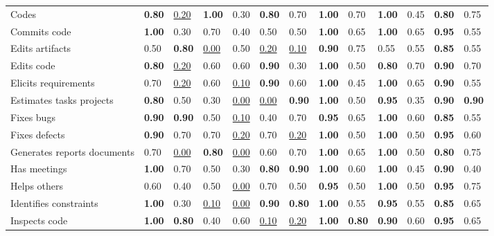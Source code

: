 \begin{tabular}{lllllllllllll}
Codes & \textbf{0.80} & \underline{0.20} & \textbf{1.00} & 0.30 & \textbf{0.80} & 0.70 & \textbf{1.00} & 0.70 & \textbf{1.00} & 0.45 & \textbf{0.80} & 0.75 \\
Commits code & \textbf{1.00} & 0.30 & 0.70 & 0.40 & 0.50 & 0.50 & \textbf{1.00} & 0.65 & \textbf{1.00} & 0.65 & \textbf{0.95} & 0.55 \\
Edits artifacts & 0.50 & \textbf{0.80} & \underline{0.00} & 0.50 & \underline{0.20} & \underline{0.10} & \textbf{0.90} & 0.75 & 0.55 & 0.55 & \textbf{0.85} & 0.55 \\
Edits code & \textbf{0.80} & \underline{0.20} & 0.60 & 0.60 & \textbf{0.90} & 0.30 & \textbf{1.00} & 0.50 & \textbf{0.80} & 0.70 & \textbf{0.90} & 0.70 \\
Elicits requirements & 0.70 & \underline{0.20} & 0.60 & \underline{0.10} & \textbf{0.90} & 0.60 & \textbf{1.00} & 0.45 & \textbf{1.00} & 0.65 & \textbf{0.90} & 0.55 \\
Estimates tasks projects & \textbf{0.80} & 0.50 & 0.30 & \underline{0.00} & \underline{0.00} & \textbf{0.90} & \textbf{1.00} & 0.50 & \textbf{0.95} & 0.35 & \textbf{0.90} & \textbf{0.90} \\
Fixes bugs & \textbf{0.90} & \textbf{0.90} & 0.50 & \underline{0.10} & 0.40 & 0.70 & \textbf{0.95} & 0.65 & \textbf{1.00} & 0.60 & \textbf{0.85} & 0.55 \\
Fixes defects & \textbf{0.90} & 0.70 & 0.70 & \underline{0.20} & 0.70 & \underline{0.20} & \textbf{1.00} & 0.50 & \textbf{1.00} & 0.50 & \textbf{0.95} & 0.60 \\
Generates reports documents & 0.70 & \underline{0.00} & \textbf{0.80} & \underline{0.00} & 0.60 & 0.70 & \textbf{1.00} & 0.65 & \textbf{1.00} & 0.50 & \textbf{0.80} & 0.75 \\
Has meetings & \textbf{1.00} & 0.70 & 0.50 & 0.30 & \textbf{0.80} & \textbf{0.90} & \textbf{1.00} & 0.60 & \textbf{1.00} & 0.45 & \textbf{0.90} & 0.40 \\
Helps others & 0.60 & 0.40 & 0.50 & \underline{0.00} & 0.70 & 0.50 & \textbf{0.95} & 0.50 & \textbf{1.00} & 0.50 & \textbf{0.95} & 0.75 \\
Identifies constraints & \textbf{1.00} & 0.30 & \underline{0.10} & \underline{0.00} & \textbf{0.90} & \textbf{0.80} & \textbf{1.00} & 0.55 & \textbf{0.95} & 0.55 & \textbf{0.85} & 0.65 \\
Inspects code & \textbf{1.00} & \textbf{0.80} & 0.40 & 0.60 & \underline{0.10} & \underline{0.20} & \textbf{1.00} & \textbf{0.80} & \textbf{0.90} & 0.60 & \textbf{0.95} & 0.65 \\

\end{tabular}
